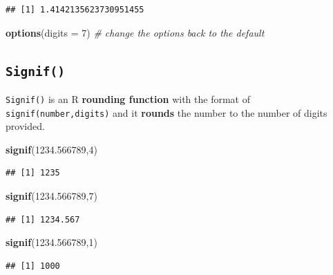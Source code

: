 \documentclass[
]{book}
\newenvironment{Shaded}{\begin{snugshade}}{\end{snugshade}}
\newcommand{\AttributeTok}[1]{\textcolor[rgb]{0.13,0.29,0.53}{#1}}
\newcommand{\CommentTok}[1]{\textcolor[rgb]{0.56,0.35,0.01}{\textit{#1}}}
\newcommand{\DecValTok}[1]{\textcolor[rgb]{0.00,0.00,0.81}{#1}}
\newcommand{\FloatTok}[1]{\textcolor[rgb]{0.00,0.00,0.81}{#1}}
\newcommand{\FunctionTok}[1]{\textcolor[rgb]{0.13,0.29,0.53}{\textbf{#1}}}
\newcommand{\NormalTok}[1]{#1}
\begin{document}
\begin{verbatim}
## [1] 1.4142135623730951455
\end{verbatim}

\begin{Shaded}
\begin{Highlighting}[]
\FunctionTok{options}\NormalTok{(}\AttributeTok{digits =} \DecValTok{7}\NormalTok{)         }\CommentTok{\# change the options back to the default}
\end{Highlighting}
\end{Shaded}

\hypertarget{signif}{%
\subsection{\texorpdfstring{\texttt{Signif()}}{Signif()}}\label{signif}}

\texttt{Signif()} is an R \textbf{rounding function} with the format of \texttt{signif(number,digits)} and it \textbf{rounds} the number to the number of digits provided.

\begin{Shaded}
\begin{Highlighting}[]
\FunctionTok{signif}\NormalTok{(}\FloatTok{1234.566789}\NormalTok{,}\DecValTok{4}\NormalTok{)}
\end{Highlighting}
\end{Shaded}

\begin{verbatim}
## [1] 1235
\end{verbatim}

\begin{Shaded}
\begin{Highlighting}[]
\FunctionTok{signif}\NormalTok{(}\FloatTok{1234.566789}\NormalTok{,}\DecValTok{7}\NormalTok{)}
\end{Highlighting}
\end{Shaded}

\begin{verbatim}
## [1] 1234.567
\end{verbatim}

\begin{Shaded}
\begin{Highlighting}[]
\FunctionTok{signif}\NormalTok{(}\FloatTok{1234.566789}\NormalTok{,}\DecValTok{1}\NormalTok{)}
\end{Highlighting}
\end{Shaded}

\begin{verbatim}
## [1] 1000
\end{verbatim}
\end{document}
